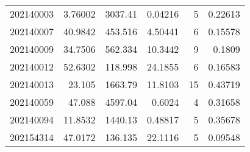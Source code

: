 \begin{tabular}{rrrrrr}
 202140003 &          3.76002 &     3037.41   &            0.04216 &           5 & 0.22613 \\
 202140007 &         40.9842  &      453.516  &            4.50441 &           6 & 0.15578 \\
 202140009 &         34.7506  &      562.334  &           10.3442  &           9 & 0.1809  \\
 202140012 &         52.6302  &      118.998  &           24.1855  &           6 & 0.16583 \\
 202140013 &         23.105   &     1663.79   &           11.8103  &          15 & 0.43719 \\
 202140059 &         47.088   &     4597.04   &            0.6024  &           4 & 0.31658 \\
 202140094 &         11.8532  &     1440.13   &            0.48817 &           5 & 0.35678 \\
 202154314 &         47.0172  &      136.135  &           22.1116  &           5 & 0.09548 \\
\hline
\end{tabular}